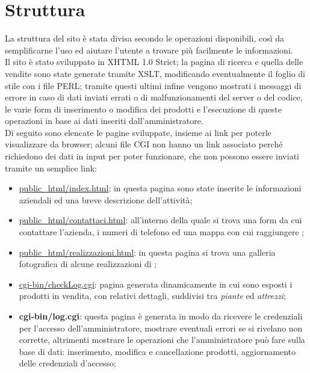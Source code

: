 \section{Struttura}{
	La struttura del sito è stata divisa secondo le operazioni disponibili, così da semplificarne l'uso ed aiutare l'utente a trovare più facilmente le informazioni.
	\\
	Il sito è stato sviluppato in XHTML 1.0 Strict; la pagina di ricerca e quella delle vendite sono state generate tramite XSLT, modificando eventualmente il foglio di stile con i file PERL; tramite questi ultimi infine vengono mostrati i messaggi di errore in caso di dati inviati errati o di malfunzionamenti del server o del codice, le varie form di inserimento o modifica dei prodotti e l'esecuzione di queste operazioni in base ai dati inseriti dall'amministratore.
	\\
	Di seguito sono elencate le pagine sviluppate, insieme ai link per poterle visualizzare da browser; alcuni file CGI non hanno un link associato perché richiedono dei dati in input per poter funzionare, che non possono essere inviati tramite un semplice link:
	\begin{itemize}\itemsep1pt
		\item \href{http://tecnologie-web.studenti.math.unipd.it/tecweb/~pgabelli/}{public\_html/index.html}: in questa pagina sono state inserite le informazioni aziendali ed una breve descrizione dell'attività;
		\item \href{http://tecnologie-web.studenti.math.unipd.it/tecweb/~pgabelli/contattaci.html}{public\_html/contattaci.html}: all'interno della quale si trova una form da cui contattare l'azienda, i numeri di telefono ed una mappa con cui raggiungere \textbf{\ggt};
		\item \href{http://tecnologie-web.studenti.math.unipd.it/tecweb/~pgabelli/realizzazioni.html}{public\_html/realizzazioni.html}: in questa pagina si trova una galleria fotografica di alcune realizzazioni di \textbf{\ggt};
		\item \href{http://tecnologie-web.studenti.math.unipd.it/tecweb/~pgabelli/cgi-bin/checkLog.cgi}{cgi-bin/checkLog.cgi}: pagina generata dinamicamente in cui sono esposti i prodotti in vendita, con relativi dettagli, suddivisi tra \textit{piante} ed \textit{attrezzi};
		\item \textbf{cgi-bin/log.cgi}: questa pagina è generata in modo da ricevere le credenziali per l'accesso dell'amministratore, mostrare eventuali errori se si rivelano non corrette, altrimenti mostrare le operazioni che l'amministratore può fare sulla base di dati: inserimento, modifica e cancellazione prodotti, aggiornamento delle credenziali d'accesso;

\end{itemize}}
